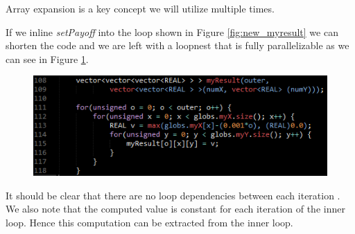 Array expansion is a key concept we will utilize multiple times.

If we inline \emph{setPayoff} into the loop shown in Figure \ref{fig:new_myresult}
we can shorten the code and we are left with a loopnest that is fully
parallelizable as we can see in Figure \ref{fig:new_myresult2}.

\begin{figure}[!ht]
	\centering
		\includegraphics[scale=1]{input/figures/new_myResult2.png}
		\caption{\label{fig:new_myresult2}}
\end{figure}

It should be clear that there are no loop dependencies between each iteration
. We also note that the computed value is constant for each iteration of the
inner loop. Hence this computation can be extracted from the inner loop.
